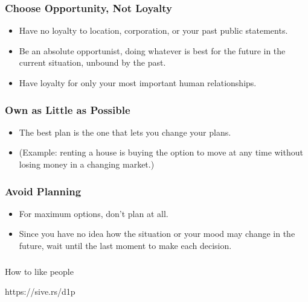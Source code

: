\begin{frame}[fragile]\frametitle{Choose Opportunity, Not Loyalty}

\begin{itemize}
\item Have no loyalty to location, corporation, or your past public statements.
\item Be an absolute opportunist, doing whatever is best for the future in the current situation, unbound by the past.
\item Have loyalty for only your most important human relationships.
\end{itemize}

\end{frame}

\begin{frame}[fragile]\frametitle{Own as Little as Possible}

\begin{itemize}
\item The best plan is the one that lets you change your plans.
\item (Example: renting a house is buying the option to move at any time without losing money in a changing market.)
\end{itemize}

\end{frame}

\begin{frame}[fragile]\frametitle{Avoid Planning}

\begin{itemize}
\item For maximum options, don’t plan at all.
\item Since you have no idea how the situation or your mood may change in the future, wait until the last moment to make each decision.
\end{itemize}

\end{frame}


\begin{frame}[fragile]\frametitle{}
\begin{center}
{\Large How to like people}
\end{center}

{\tiny https://sive.rs/d1p}

\end{frame}

